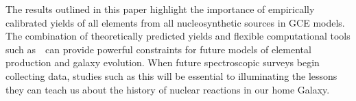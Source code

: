 \documentclass[ms.tex]{subfiles}
\begin{document}
\par
The results outlined in this paper highlight the importance of empirically
calibrated yields of all elements from all nucleosynthetic sources in GCE
models.
The combination of theoretically predicted yields and flexible computational
tools such as~\vice~can provide powerful constraints for future models of
elemental production and galaxy evolution.
When future spectroscopic surveys begin collecting data, studies such as this
will be essential to illuminating the lessons they can teach us about the
history of nuclear reactions in our home Galaxy.
\end{document}
